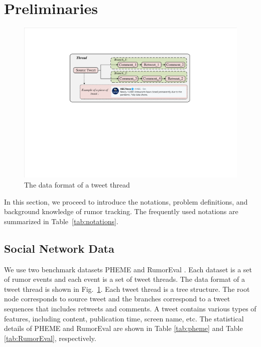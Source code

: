 \section{Preliminaries}
\label{sec:perliminary}

\begin{figure}[tbp]
	\hspace{0ex}
	\vspace{0ex}
	\centering
	\includegraphics[width = \textwidth]{fig/data_format}
	\caption{The data format of a tweet thread}
	\label{fig:data_format}
\end{figure}

In this section, we proceed to introduce the notations, problem definitions, and background knowledge of rumor tracking. The frequently used notations are summarized in Table~\ref{tab:notations}.

\subsection{Social Network Data}
\label{sec:social_network_data}
We use two benchmark datasets PHEME \cite{DBLP:conf/coling/KochkinaLZ18} and RumorEval \cite{DBLP:conf/semeval/EnayetE17}. Each dataset is a set of rumor events and each event is a set of tweet threads. The data format of a tweet thread is shown in Fig.~\ref{fig:data_format}. Each tweet thread is a tree structure. The root node corresponds to source tweet and the branches correspond to a tweet sequences that includes retweets and comments. A tweet contains various types of features, including content, publication time, screen name, etc. The statistical details of PHEME and RumorEval are shown in Table \ref{tab:pheme} and Table \ref{tab:RumorEval}, respectively.

